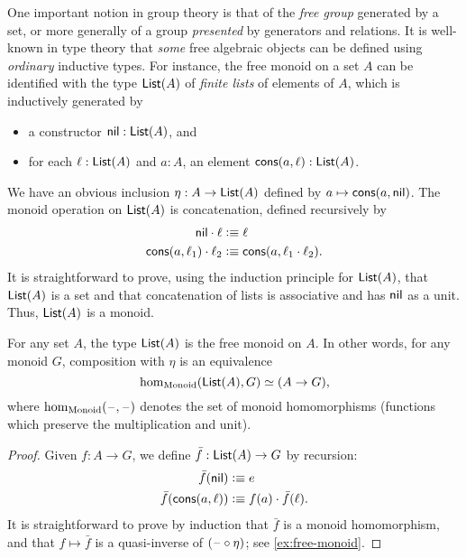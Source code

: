 %
%
One important notion in group theory is that of the \emph{free group} generated by a set, or more generally of a group \emph{presented} by generators and relations.
It is well-known in type theory that \emph{some} free algebraic objects can be defined using \emph{ordinary} inductive types.
%
%
%
%
For instance, the free monoid on a set $A$ can be identified with the type $\mathsf{List}(A)$ of \emph{finite lists}  of elements of $A$, which is inductively generated by
\begin{itemize}
\item a constructor $\mathsf{nil}:\mathsf{List}(A)$, and
\item for each $\ell:\mathsf{List}(A)$ and $a:A$, an element $\mathsf{cons}(a,\ell):\mathsf{List}(A)$.
\end{itemize}
We have an obvious inclusion $\eta : A\to \mathsf{List}(A)$ defined by $a\mapsto \mathsf{cons}(a,\mathsf{nil})$.
The monoid operation on $\mathsf{List}(A)$ is concatenation, defined recursively by
\begin{align*}
  \mathsf{nil} \cdot \ell &\vcentcolon\equiv \ell\\
  \mathsf{cons} (a,\ell_1) \cdot \ell_2 &\vcentcolon\equiv \mathsf{cons}(a, \ell_1\cdot\ell_2).
\end{align*}
It is straightforward to prove, using the induction principle for $\mathsf{List}(A)$, that $\mathsf{List}(A)$ is a set and that concatenation of lists is associative
%
and has $\mathsf{nil}$ as a unit.
Thus, $\mathsf{List}(A)$ is a monoid.

\begin{lem}\label{thm:free-monoid}
  For any set $A$, the type $\mathsf{List}(A)$ is the free monoid on $A$.
  In other words, for any monoid $G$, composition with $\eta$ is an equivalence
  \[ \hom_{\mathrm{Monoid}}(\mathsf{List}(A),G) \simeq (A\to G), \]
  where $\hom_{\mathrm{Monoid}}(\mathord{\hspace{1pt}\text{--}\hspace{1pt}},\mathord{\hspace{1pt}\text{--}\hspace{1pt}})$ denotes the set of monoid homomorphisms (functions which preserve the multiplication and unit).
\end{lem}
\begin{proof}
  Given $f:A\to G$, we define $\bar{f}:\mathsf{List}(A) \to G$ by recursion:
  \begin{align*}
    \bar{f}(\mathsf{nil}) &\vcentcolon\equiv e\\
    \bar{f}(\mathsf{cons}(a,\ell)) &\vcentcolon\equiv f(a) \cdot \bar{f}(\ell).
  \end{align*}
  It is straightforward to prove by induction that $\bar{f}$ is a monoid homomorphism, and that $f\mapsto \bar f$ is a quasi-inverse of $(\mathord{\hspace{1pt}\text{--}\hspace{1pt}}\circ \eta)$; see \autoref{ex:free-monoid}.
\end{proof}

